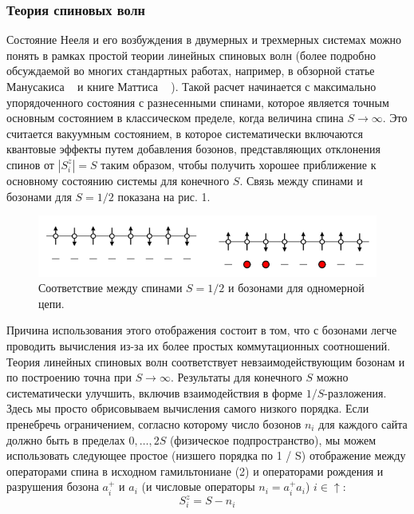 \documentclass[11pt]{article}
\begin{document}
\subsubsection{Теория спиновых волн}
Состояние Нееля и его возбуждения в двумерных и трехмерных системах можно понять в рамках простой теории линейных спиновых волн (более подробно обсуждаемой во многих стандартных работах, например, в обзорной статье Манусакиса ~\cite{rmp_63_1} и книге Маттиса ~\cite{Mattis} ). Такой расчет
начинается с максимально упорядоченного состояния с разнесенными спинами, которое является точным основным состоянием в классическом пределе, когда величина спина $S \to \infty$. Это считается вакуумным состоянием, в которое систематически включаются квантовые эффекты путем добавления бозонов, представляющих отклонения спинов от $| S_i^z | = S$ таким образом, чтобы получить хорошее приближение к основному состоянию системы для конечного $S$.
Связь между спинами и бозонами для $S = 1/2$ показана на рис. 1. 

\begin{figure}[htp]
\centering
\includegraphics[scale=0.5]{fig1}
\caption{Соответствие между спинами $S = 1/2$ и бозонами для одномерной цепи.}
\label{}
\end{figure}

Причина использования этого отображения состоит в том, что с бозонами легче проводить вычисления из-за их более простых коммутационных соотношений. Теория линейных спиновых волн соответствует невзаимодействующим бозонам и по построению точна при $S \to \infty$. Результаты для конечного $S$ можно систематически улучшить, включив взаимодействия в форме $1 / S$-разложения. Здесь мы просто обрисовываем вычисления самого низкого порядка.
Если пренебречь ограничением, согласно которому число бозонов $n_i$ для каждого сайта должно быть в пределах $0, \dots , 2S$ (физическое подпространство), мы можем использовать следующее простое (низшего порядка по 1 / S) отображение между операторами спина в исходном гамильтониане (2) и операторами рождения и разрушения бозона $a_i^{+}$ и $a_i$ (и числовые операторы $n_i = a_i^{+}a_i$)
$i \in ↑$:
\begin{equation*}
 S_i^z=S-n_i 
\end{equation*}
\end{document}
